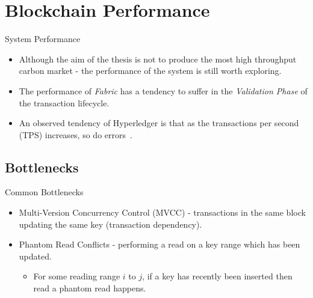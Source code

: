 \section{Blockchain Performance}
\begin{frame}{System Performance}
    \begin{itemize}
        \item Although the aim of the thesis is not to produce the most
              high throughput carbon market - the performance of the
              system is still worth exploring.
        \item The performance of \textit{Fabric} has a tendency to
              suffer in the \textit{Validation Phase} of the transaction lifecycle.
        \item An observed tendency of Hyperledger is that as the transactions
              per second (TPS) increases, so do
              errors~\cite{10.1145/3448016.3452823}.
    \end{itemize}
\end{frame}
\subsection{Bottlenecks}
\begin{frame}{Common Bottlenecks}
    \begin{itemize}
        \item Multi-Version Concurrency Control (MVCC) - transactions in the
              same block updating the same key (transaction dependency).
        \item Phantom Read Conflicts - performing a read on a key range
              which has been updated.
              \begin{itemize}
                  \item For some reading range $i$ to $j$,
                        if a key has recently
                        been inserted then read a phantom read happens.
              \end{itemize}
    \end{itemize}
\end{frame}
